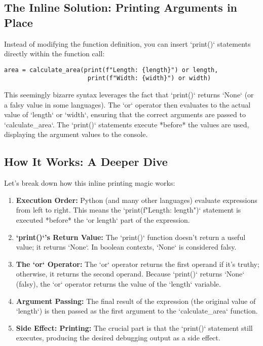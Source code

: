 \documentclass{article}
\begin{document}
{{{{\subsection*{The Inline Solution: Printing Arguments in Place}

Instead of modifying the function definition, you can insert `print()` statements directly within the function call:

\begin{verbatim}
area = calculate_area(print(f"Length: {length}") or length,
                       print(f"Width: {width}") or width)
\end{verbatim}

This seemingly bizarre syntax leverages the fact that `print()` returns `None` (or a falsy value in some languages). The `or` operator then evaluates to the actual value of `length` or `width`, ensuring that the correct arguments are passed to `calculate_area`. The `print()` statements execute *before* the values are used, displaying the argument values to the console.

\subsection*{How It Works: A Deeper Dive}

Let's break down how this inline printing magic works:

\begin{enumerate}
    \item \textbf{Execution Order:} Python (and many other languages) evaluate expressions from left to right. This means the `print(f"Length: {length}")` statement is executed *before* the `or length` part of the expression.
    \item \textbf{`print()`'s Return Value:} The `print()` function doesn't return a useful value; it returns `None`.  In boolean contexts, `None` is considered falsy.
    \item \textbf{The `or` Operator:} The `or` operator returns the first operand if it's truthy; otherwise, it returns the second operand. Because `print()` returns `None` (falsy), the `or` operator returns the value of the `length` variable.
    \item \textbf{Argument Passing:} The final result of the expression (the original value of `length`) is then passed as the first argument to the `calculate_area` function.
    \item \textbf{Side Effect: Printing:} The crucial part is that the `print()` statement still executes, producing the desired debugging output as a side effect.
\end{enumerate}

}}}}
\end{document}
